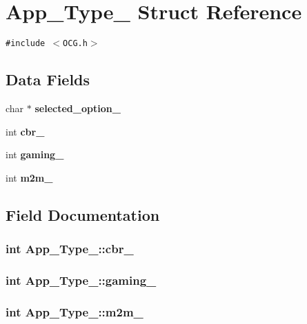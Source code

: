\section{App\_\-Type\_\- Struct Reference}
\label{structApp__Type__}
{\tt \#include $<$OCG.h$>$}

\subsection*{Data Fields}
\begin{CompactItemize}
\item 
char $\ast$ {\bf selected\_\-option\_\-}
\item 
int {\bf cbr\_\-}
\item 
int {\bf gaming\_\-}
\item 
int {\bf m2m\_\-}
\end{CompactItemize}


\subsection{Field Documentation}
\subsubsection[{cbr\_\-}]{\setlength{\rightskip}{0pt plus 5cm}int {\bf App\_\-Type\_\-::cbr\_\-}}\label{structApp__Type___8713974868de9be96e4df317a4c155d5}


\subsubsection[{gaming\_\-}]{\setlength{\rightskip}{0pt plus 5cm}int {\bf App\_\-Type\_\-::gaming\_\-}}\label{structApp__Type___20838e7dcdf173d98baedc1dc144b567}


\subsubsection[{m2m\_\-}]{\setlength{\rightskip}{0pt plus 5cm}int {\bf App\_\-Type\_\-::m2m\_\-}}\label{structApp__Type___502734e029a6dfca4bec111a435f1c31}


